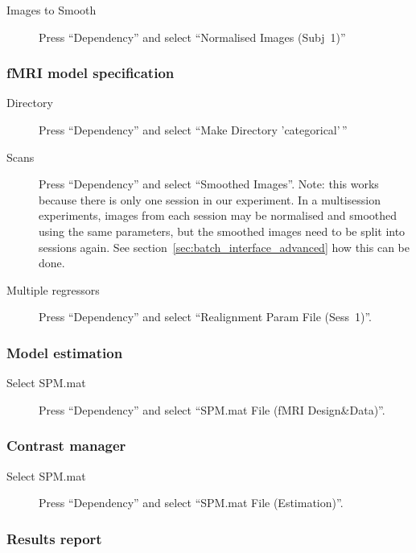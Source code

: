 \begin{description}
\item[Images to Smooth] Press ``Dependency'' and select ``Normalised Images
  (Subj~1)''
\end{description}

\subsubsection*{fMRI model specification}

\begin{description}
\item[Directory] Press ``Dependency'' and select ``Make Directory
  'categorical'\,''
\item[Scans] Press ``Dependency'' and select ``Smoothed Images''. Note: this
  works because there is only one session in our experiment. In a
  multisession experiments, images from each session may be normalised and
  smoothed using the same parameters, but the smoothed images need to be
  split into sessions again. See section~\ref{sec:batch_interface_advanced}
  how this can be done.
\item[Multiple regressors] Press ``Dependency'' and select ``Realignment
  Param File (Sess~1)''.
\end{description}

\subsubsection*{Model estimation}

\begin{description}
\item[Select SPM.mat] Press ``Dependency'' and select ``SPM.mat File (fMRI
  Design\&Data)''.
\end{description}

\subsubsection*{Contrast manager}

\begin{description}
\item[Select SPM.mat] Press ``Dependency'' and select ``SPM.mat File
  (Estimation)''. 
\end{description}

\subsubsection*{Results report}

